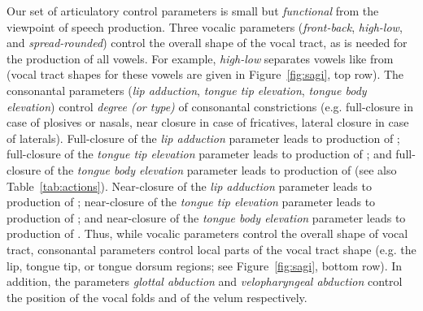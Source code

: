 \documentclass[conference]{IEEEtran}
\let\ipa\textipa
\begin{document}
Our set of articulatory control parameters is small but
\textit{functional} from the viewpoint of speech production. Three
vocalic parameters (\textit{front-back}, \textit{high-low}, and
\textit{spread-rounded}) control the overall shape of the vocal tract,
as is needed for the production of all vowels. For example, \textit{high-low} separates
vowels like \ipa{[i, y, u]} from \ipa{[A]} (vocal tract shapes for these vowels are given in
Figure~\ref{fig:sagi}, top row). The consonantal parameters (\textit{lip
  adduction}, \textit{tongue tip elevation}, \textit{tongue body
  elevation}) control \textit{degree (or type)} of consonantal
constrictions (e.g. full-closure in case of plosives or nasals, near
closure in case of fricatives, lateral closure in case of laterals).
Full-closure of the \textit{lip adduction} parameter
leads to production of \ipa{[p, b, m]}; full-closure of the
\textit{tongue tip elevation} parameter leads to production of
\ipa{[d, t, n]}; and full-closure of the \textit{tongue body elevation} parameter
leads to production of \ipa{[k, g]} (see also Table~\ref{tab:actions}).
Near-closure of the \textit{lip adduction} parameter leads to production
of \ipa{[f]}; near-closure of the \textit{tongue tip elevation} parameter leads
to production of \ipa{[s, z, S, Z]}; and near-closure of the
\textit{tongue body elevation} parameter leads to production of \ipa{[x]}.
Thus, while vocalic parameters control the overall shape of vocal tract,
consonantal parameters control local parts
of the vocal tract shape (e.g. the lip, tongue tip, or tongue
dorsum regions; see Figure~\ref{fig:sagi}, bottom row). In addition, the
parameters \textit{glottal abduction} and \textit{velopharyngeal abduction}
control the position of the vocal folds
and of the velum respectively.
\end{document}
